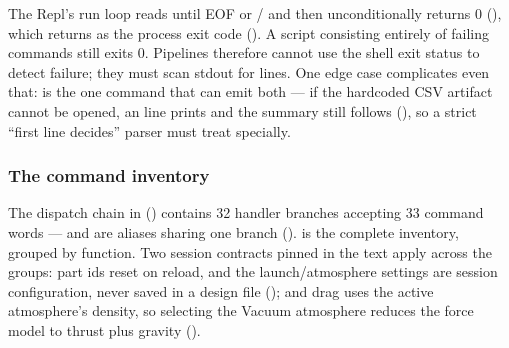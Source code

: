 \begin{keyinsight}
The Repl's run loop reads until EOF or / and then unconditionally
returns 0 (), which  returns as the process exit code
(). A script consisting entirely of failing commands still exits 0.
Pipelines therefore cannot use the shell exit status to detect failure; they must scan stdout
for  lines. One edge case complicates even that:  is the one command
that can emit both --- if the hardcoded CSV artifact cannot be opened, an
 line prints and the  summary still
follows (), so a strict ``first line decides'' parser must treat
 specially.
\end{keyinsight}

\subsubsection{The command inventory}\label{sec:interfaces-cli-commands}

The dispatch chain in  () contains 32 handler
branches accepting 33 command words ---  and  are aliases sharing one
branch ().  is the complete inventory,
grouped by function. Two session contracts pinned in the  text apply across the
groups: part ids reset on reload, and the launch/atmosphere settings are session
configuration, never saved in a design file (); and drag uses the
active atmosphere's density, so selecting the Vacuum atmosphere reduces the force model to
thrust plus gravity ().

